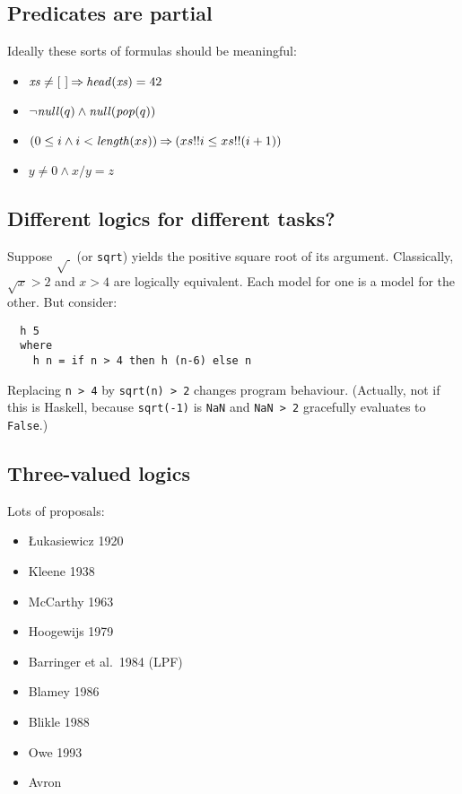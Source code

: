 \documentclass{llncs}
\newcommand{\id}[1]{\mbox{\textit{#1}}}
\newcommand{\impl}{\mathbin{\Rightarrow}}
\begin{document}
\subsection{Predicates are partial}

Ideally these sorts of formulas should be meaningful:
\begin{itemize}
\item
$\id{xs} \not= [~] \impl \id{head}(\id{xs}) = 42 $
\item
$\neg \id{null}(q) \land \id{null}(\id{pop}(q)) $
\item
$(0 \leq i \land i < \id{length}(xs)) \impl (xs!!i \leq xs!!(i+1)) $
\item
$y \not= 0 \land x/y = z $
\end{itemize}

\subsection{Different logics for different tasks?}

Suppose $\sqrt{~}$ (or \verb!sqrt!) yields the positive square root of 
its argument.
Classically, $\sqrt{x} > 2$ and $x > 4$ are logically equivalent.
Each model for one is a model for the other.
But consider:
\begin{verbatim}
  h 5
  where
    h n = if n > 4 then h (n-6) else n
\end{verbatim}
Replacing \verb!n > 4! by \verb!sqrt(n) > 2! changes program behaviour.
(Actually, not if this is Haskell, because \verb!sqrt(-1)! is \verb!NaN!
and \verb!NaN > 2! gracefully evaluates to \verb!False!.)

\subsection{Three-valued logics}

Lots of proposals:
\begin{itemize}
\item
    {\L}ukasiewicz 1920~\cite{Luk:RF20}
\item
    Kleene 1938~\cite{Kleene38,Kleene52}
\item
    McCarthy 1963~\cite{McCarthy:FormalBasis63}
\item
    Hoogewijs 1979~\cite{Hoogewijs:ActaInf87}
\item
    Barringer et al.~1984 (LPF)~\cite{Barringer:ActaInf84}
\item
    Blamey 1986~\cite{Blamey:HPL86}
\item
    Blikle 1988~\cite{Blikle:VDM88}
\item
    Owe 1993~\cite{Owe:FAC93}
\item
    Avron
\end{itemize}
%
\end{document}
